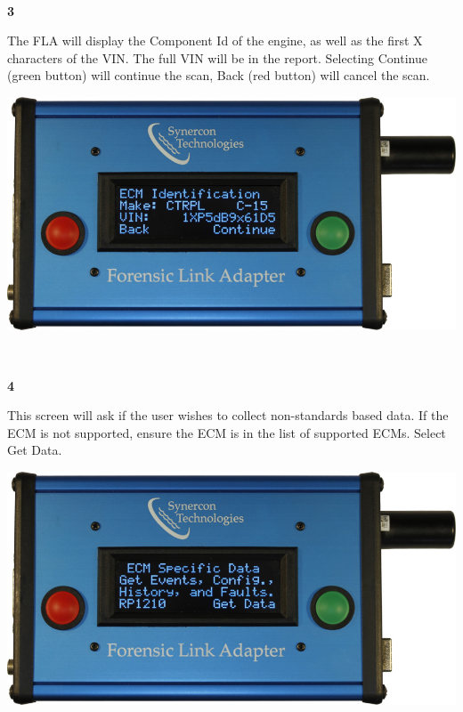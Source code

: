 \documentclass[11pt]{article}
\begin{document}
\\[\baselineskip]
\noindent\begin{minipage}{0.3\textwidth}%
\begin{center}
\textbf{3}\\[\baselineskip]
\end{center}
The FLA will display the Component Id of the engine, as well as the first X characters of the VIN. The full VIN will be in the report. Selecting Continue (green button) will continue the scan, Back (red button) will cancel the scan.
\end{minipage}%
\hfill%
\begin{minipage}{0.6\textwidth}
\includegraphics[width=\linewidth]{../media/fla_screens/ethernet_and_others/veh_scan/comp_id}
\end{minipage}
\\[\baselineskip]
\noindent\begin{minipage}{0.3\textwidth}%
\begin{center}
\textbf{4}\\[\baselineskip]
\end{center}
This screen will ask if the user wishes to collect non-standards based data. If the ECM is not supported, ensure the ECM is in the list of supported ECMs. Select Get Data.
\end{minipage}%
\hfill%
\begin{minipage}{0.6\textwidth}
\includegraphics[width=\linewidth]{../media/fla_screens/ethernet_and_others/veh_scan/get_ecm_specific}
\end{minipage}
\end{document}
